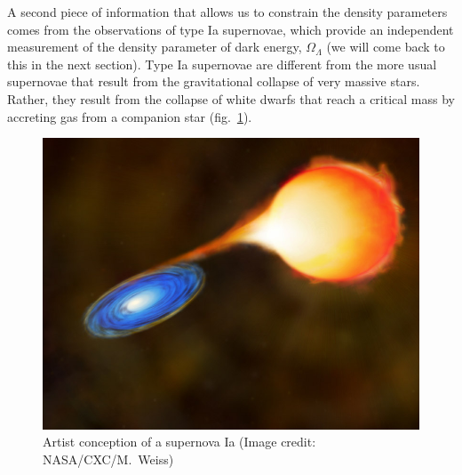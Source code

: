 A second piece of information that allows us to constrain the density parameters comes from the observations of type Ia supernovae, which provide an independent measurement of the density parameter of dark energy, $\Omega_{\Lambda}$ (we will come back to this in the next section). Type Ia supernovae are different from the more usual supernovae that result from the gravitational collapse of very massive stars. Rather, they result from the collapse of white dwarfs that reach a critical mass by accreting gas from a companion star (fig.\ \ref{fig:lec10_3}).
\begin{figure}[ht]
\begin{center}
\includegraphics[scale=0.3]{Draw/lec10_3.png}
\end{center}
\caption{Artist conception of a supernova Ia (Image credit: NASA/CXC/M.\ Weiss)}
\label{fig:lec10_3}
\end{figure}

